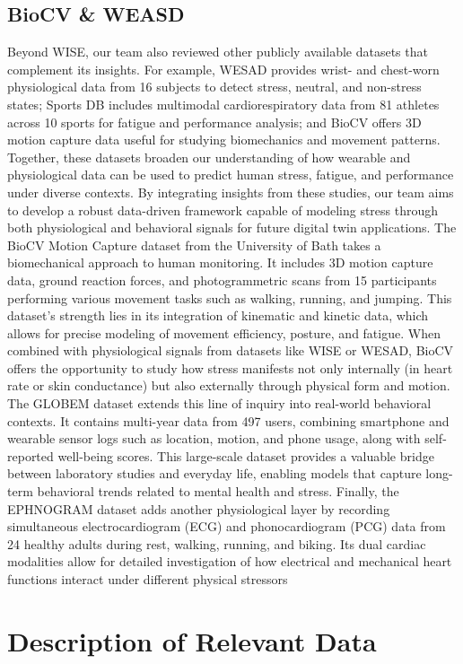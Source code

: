 \documentclass[12pt,letterpaper]{article}
\begin{document}
\subsection{BioCV \&  WEASD}
Beyond WISE, our team also reviewed other publicly available datasets that complement its insights. For example, WESAD provides wrist- and chest-worn physiological data from 16 subjects to detect stress, neutral, and non-stress states; Sports DB includes multimodal cardiorespiratory data from 81 athletes across 10 sports for fatigue and performance analysis; and BioCV offers 3D motion capture data useful for studying biomechanics and movement patterns. Together, these datasets broaden our understanding of how wearable and physiological data can be used to predict human stress, fatigue, and performance under diverse contexts. By integrating insights from these studies, our team aims to develop a robust data-driven framework capable of modeling stress through both physiological and behavioral signals for future digital twin applications. The BioCV Motion Capture dataset from the University of Bath takes a biomechanical approach to human monitoring. It includes 3D motion capture data, ground reaction forces, and photogrammetric scans from 15 participants performing various movement tasks such as walking, running, and jumping. This dataset’s strength lies in its integration of kinematic and kinetic data, which allows for precise modeling of movement efficiency, posture, and fatigue. When combined with physiological signals from datasets like WISE or WESAD, BioCV offers the opportunity to study how stress manifests not only internally (in heart rate or skin conductance) but also externally through physical form and motion.  The GLOBEM dataset extends this line of inquiry into real-world behavioral contexts. It contains multi-year data from 497 users, combining smartphone and wearable sensor logs such as location, motion, and phone usage, along with self-reported well-being scores. This large-scale dataset provides a valuable bridge between laboratory studies and everyday life, enabling models that capture long-term behavioral trends related to mental health and stress. Finally, the EPHNOGRAM dataset adds another physiological layer by recording simultaneous electrocardiogram (ECG) and phonocardiogram (PCG) data from 24 healthy adults during rest, walking, running, and biking. Its dual cardiac modalities allow for detailed investigation of how electrical and mechanical heart functions interact under different physical stressors


\section{Description of Relevant Data}
\end{document}

